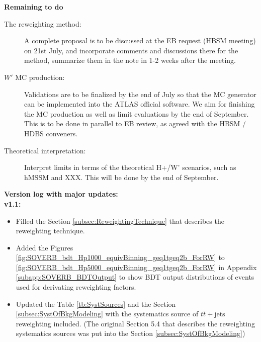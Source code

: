 \textbf{Remaining to do}

\begin{description}

\item[The reweighting method:] A complete proposal is to be discussed at the EB request (HBSM meeting) on 21st July, and incorporate comments and discussions there for the method, summarize them in the note in 1-2 weeks after the meeting.

\item[$W'$ MC production:] Validations are to be finalized by the end of July so that the MC generator can be implemented into the ATLAS official software. We aim for finishing the MC production as well as limit evaluations by the end of September. This is to be done in parallel to EB review, as agreed with the HBSM / HDBS conveners.

\item[Theoretical interpretation: ] Interpret limits in terms of the theoretical H+/W' scenarios, such as hMSSM and XXX. This will be done by the end of September.

\end{description}


\textbf{Version log with major updates:}\\
\textbf{\color{blue}v1.1:}
\begin{itemize}
  \item Filled the Section \ref{subsec:ReweightingTechnique} that describes the reweighting technique.
  \item Added the Figures \ref{fig:SOVERB_bdt_Hp1000_equivBinning_geq1tgeq2b_ForRW} to \ref{fig:SOVERB_bdt_Hp5000_equivBinning_geq1tgeq2b_ForRW} in Appendix \ref{subapp:SOVERB_BDTOutput} to show BDT output distributions of events used for derivating reweighting factors.
  \item Updated the Table \ref{tb:SystSources} and the Section \ref{subsec:SystOfBkgModeling} with the systematics source of $t\bar{t}+\text{jets}$ reweighting included. (The original Section 5.4 that describes the reweighting systematics sources was put into the Section \ref{subsec:SystOfBkgModeling})
\end{itemize}

